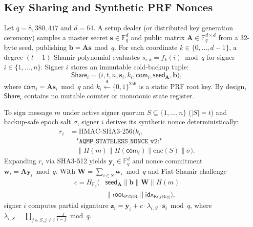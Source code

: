 \documentclass[conference,compsoc]{IEEEtran}
\begin{document}
\subsection{Key Sharing and Synthetic PRF Nonces}
Let $q = 8{,}380{,}417$ and $d = 64$. A setup dealer (or distributed key generation ceremony) samples a master secret $\mathbf{s} \in \mathbb{F}_q^d$ and public matrix $\mathbf{A} \in \mathbb{F}_q^{d \times d}$ from a 32-byte seed, publishing $\mathbf{b} = \mathbf{A}\mathbf{s} \bmod q$. For each coordinate $k \in \{0, \dots, d-1\}$, a degree-$(t-1)$ Shamir polynomial evaluates $s_{i,k} = f_k(i) \bmod q$ for signer $i \in \{1, \dots, n\}$. Signer $i$ stores an immutable cold-backup tuple:
\begin{equation}
\mathsf{Share}_i = \big(i, t, n, \mathbf{s}_i, k_i, \mathsf{com}_i, \mathsf{seed}_{\mathbf{A}}, \mathbf{b}\big),
\end{equation}
where $\mathsf{com}_i = \mathbf{A}\mathbf{s}_i \bmod q$ and $k_i \xleftarrow{\$} \{0,1\}^{256}$ is a static PRF root key. By design, $\mathsf{Share}_i$ contains no mutable counter or monotonic state register.

To sign message $m$ under active signer quorum $S \subseteq \{1,\dots,n\}$ ($|S|=t$) and backup-safe epoch salt $\sigma$, signer $i$ derives its synthetic nonce deterministically:
\begin{equation}
\begin{aligned}
r_i &= \mathrm{HMAC\text{-}SHA3\text{-}256}\Big(k_i, \\
    &\quad \texttt{"AQMP\_STATELESS\_NONCE\_v2:"} \\
    &\quad \parallel H(m) \parallel H(\mathsf{com}_i) \parallel \mathrm{enc}(S) \parallel \sigma\Big).
\end{aligned}
\end{equation}
Expanding $r_i$ via SHA3-512 yields $\mathbf{y}_i \in \mathbb{F}_q^d$ and nonce commitment $\mathbf{w}_i = \mathbf{A}\mathbf{y}_i \bmod q$. With $\mathbf{W} = \sum_{i \in S} \mathbf{w}_i \bmod q$ and Fiat-Shamir challenge
\begin{equation}
\begin{aligned}
c = H_{\mathbb{F}_q}\big(&\mathsf{seed}_{\mathbf{A}} \parallel \mathbf{b} \parallel \mathbf{W} \parallel H(m) \\
    &\parallel \mathsf{root}_{\text{P2MR}} \parallel \mathsf{idx}_{\text{KeyReg}}\big),
\end{aligned}
\end{equation}
signer $i$ computes partial signature $\mathbf{z}_i = \mathbf{y}_i + c \cdot \lambda_{i,S} \cdot \mathbf{s}_i \bmod q$, where $\lambda_{i,S} = \prod_{j \in S, j \ne i} \frac{-j}{i-j} \bmod q$.
\end{document}
